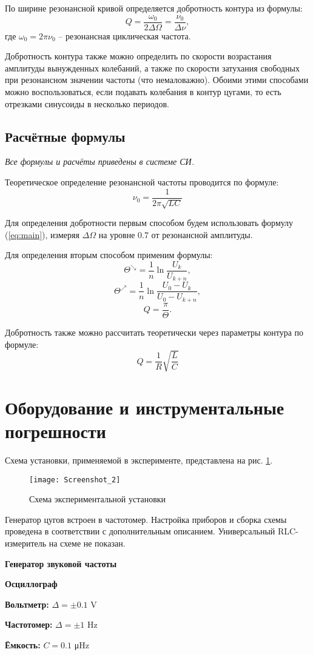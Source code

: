 \documentclass[a4paper]{article}
\newcommand{\rref}[1]{(\ref{#1})}
\newcommand{\Equip}[3]{
	
	{\bf #1:} $\Delta = \pm #2$ \si{#3}
	
}
\newcommand{\equip}[1]{
	
	{\bf #1}
	
}
\begin{document}
По ширине резонансной кривой определяется добротность контура из формулы:
\begin{equation}
	Q = \frac{\omega_0}{2 \Delta \Omega} = \frac{\nu_0}{\Delta \nu},
	\label{eq:main}
\end{equation}
где $ \omega_0 = 2 \pi \nu_0 $ -- резонансная циклическая частота.

Добротность контура также можно определить по скорости возрастания амплитуды вынужденных колебаний, а также по скорости затухания свободных при резонансном значении частоты (что немаловажно). Обоими этими способами можно воспользоваться, если подавать колебания в контур цугами, то есть отрезками синусоиды в несколько периодов. 

\subsection{Расчётные формулы}

\emph{Все формулы и расчёты приведены в системе СИ.}

Теоретическое определение резонансной частоты проводится по формуле:
\begin{equation}\label{nu}
	\nu_0 = \frac{1}{2 \pi \sqrt{L C}}
\end{equation}

Для определения добротности первым способом будем использовать формулу \rref{eq:main}, измеряя $ \Delta \Omega $ на уровне 0.7 от резонансной амплитуды.

Для определения вторым способом применим формулы:
\begin{equation}
	\Theta^\searrow = \frac{1}{n} \ln \frac{U_k}{U_{k+n}},
\end{equation}
\begin{equation}\label{key}
	\Theta^\nearrow = \frac{1}{n} \ln \frac{U_0 - U_k}{U_0 - U_{k+n}},	
\end{equation}
\begin{equation}
	Q = \frac{\pi}{\Theta}.
\end{equation}

Добротность также можно рассчитать теоретически через параметры контура по формуле:
\begin{equation}\label{teor}
	Q = \frac{1}{R } \sqrt{\frac{L}{C}}
\end{equation}

\section{Оборудование и инструментальные погрешности}
Схема установки, применяемой в эксперименте, представлена на рис. \ref{fig:set}.
\begin{figure}
	\centering
	\texttt{[image: Screenshot\_2]}
	\caption{Схема экспериментальной установки}
	\label{fig:set}
\end{figure}
Генератор цугов встроен в частотомер. Настройка приборов и сборка схемы проведена в соответствии с дополнительным описанием. Универсальный RLC-измеритель на схеме не показан.
\equip{Генератор звуковой частоты}
\equip{Осциллограф}
\Equip{Вольтметр}{0.1}{\volt}
\Equip{Частотомер}{1}{\hertz}
{\bf Ёмкость: }$C = 0.1$ \si{\micro \hertz}
\end{document}
